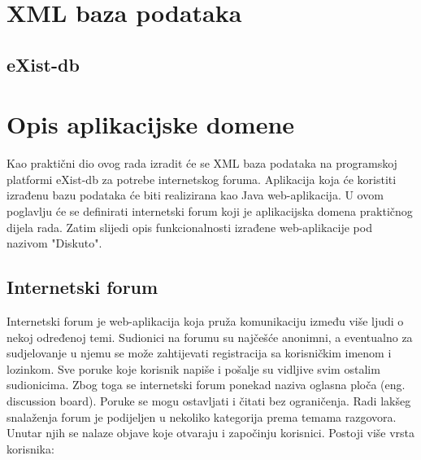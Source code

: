 \documentclass{foi}
\begin{document}
\lipsum[1-2]

\chapter{XML baza podataka}

\lipsum[1]

\section{eXist-db}

\lipsum[1]

\chapter{Opis aplikacijske domene}

Kao praktični dio ovog rada izradit će se XML baza podataka na programskoj platformi eXist-db za potrebe internetskog foruma. Aplikacija koja će koristiti izrađenu bazu podataka će biti realizirana kao Java web-aplikacija. U ovom poglavlju će se definirati internetski forum koji je aplikacijska domena praktičnog dijela rada. Zatim slijedi opis funkcionalnosti izrađene web-aplikacije pod nazivom "Diskuto".

\section{Internetski forum}

Internetski forum je web-aplikacija koja pruža komunikaciju između više ljudi o nekoj određenoj temi. Sudionici na forumu su najčešće anonimni, a eventualno za sudjelovanje u njemu se može zahtijevati registracija sa korisničkim imenom i lozinkom.  Sve poruke koje korisnik napiše i pošalje su vidljive svim ostalim sudionicima. \cite{definitionInternetForum} Zbog toga se internetski forum ponekad naziva oglasna ploča (eng. discussion board). Poruke se mogu ostavljati i čitati bez ograničenja. Radi lakšeg snalaženja forum je podijeljen u nekoliko kategorija prema temama razgovora. Unutar njih se nalaze objave koje otvaraju i započinju korisnici. Postoji više vrsta korisnika:
\end{document}
